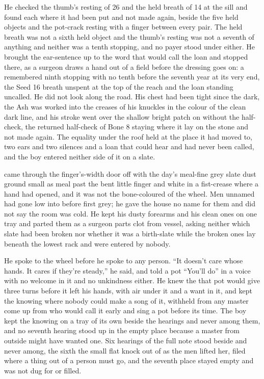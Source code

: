 He checked the thumb's resting of  26 and the held breath of  14 at the sill and found each where it had been put and not made again, beside the five held objects and the pot-crack resting with a finger between every pair. The held breath was not a sixth held object and the thumb's resting was not a seventh of anything and neither was a tenth stopping, and no payer stood under either. He brought the ear-sentence up to the word that would call the loan and stopped there, as a surgeon draws a hand out of a field before the dressing goes on: a remembered ninth stopping with no tenth before the seventh year at its very end, the Seed 16 breath unspent at the top of the reach and the loan standing uncalled. He did not look along the road. His chest had been tight since the dark, the Ash was worked into the creases of his knuckles in the colour of the clean dark line, and his stroke went over the shallow bright patch on  without the half-check, the returned half-check of Bone 8 staying where it lay on the stone and not made again. The equality under the roof held at the place it had moved to, two ears and two silences and a loan that could hear and had never been called, and the boy entered neither side of it on a slate.

 came through the finger's-width door off  with the day's meal-fine grey slate dust ground small as meal past the bent little finger and white in a fist-crease where a hand had opened, and it was not the bone-coloured  of the wheel. Men unnamed had gone low into  before first grey; he gave the house no name for them and did not say the room was cold. He kept his dusty forearms and his clean ones on one tray and parted them as a surgeon parts clot from vessel, asking neither which slate had been broken nor whether it was a birth-slate while the broken ones lay beneath the lowest rack and were entered by nobody.

He spoke to the wheel before he spoke to any person. “It doesn't care whose hands. It cares if they're steady,” he said, and told a pot “You'll do” in a voice with no welcome in it and no unkindness either. He knew the  that pot would give three turns before it left his hands, with air under it and a want in it, and kept the knowing where nobody could make a song of it, withheld from any master come up from  who would call it early and sing a pot before its time. The boy kept the knowing on a tray of its own beside the hearings and never among them, and no seventh hearing stood up in the empty place because a master from outside might have wanted one. Six hearings of the full note stood beside and never among, the sixth the small flat knock out of  as the men lifted her, filed where a thing out of a person must go, and the seventh place stayed empty and was not dug for or filled.

